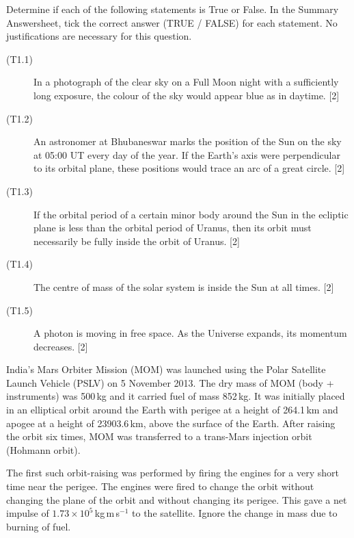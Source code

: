 Determine if each of the following statements is True or False. In the Summary
Answersheet, tick the correct answer (TRUE / FALSE) for each statement. No
justifications are necessary for this question.

\begin{description}
\item[(T1.1)] In a photograph of the clear sky on a Full Moon night with a
  sufficiently long exposure, the colour of the sky would appear blue as in
  daytime. \hfill[2]
\item[(T1.2)] An astronomer at Bhubaneswar marks the position of the Sun on
  the sky at 05:00 UT every day of the year. If the Earth's axis were
  perpendicular to its orbital plane, these positions would trace an arc of a
  great circle. \hfill[2]
\item[(T1.3)] If the orbital period of a certain minor body around the Sun in
  the ecliptic plane is less than the orbital period of Uranus, then its orbit
  must necessarily be fully inside the orbit of Uranus. \hfill[2]
\item[(T1.4)] The centre of mass of the solar system is inside the Sun at all
  times. \hfill[2]
\item[(T1.5)] A photon is moving in free space. As the Universe expands, its
  momentum decreases. \hfill[2]
\end{description}

India's Mars Orbiter Mission (MOM) was launched using the Polar Satellite
Launch Vehicle (PSLV) on 5 November 2013. The dry mass of MOM (body +
instruments) was 500\,kg and it carried fuel of mass 852\,kg. It was initially
placed in an elliptical orbit around the Earth with perigee at a height of
264.1\,km and apogee at a height of 23903.6\,km, above the surface of the
Earth. After raising the orbit six times, MOM was transferred to a trans-Mars
injection orbit (Hohmann orbit).

The first such orbit-raising was performed by firing the engines for a very
short time near the perigee. The engines were fired to change the orbit
without changing the plane of the orbit and without changing its perigee. This
gave a net impulse of $1.73 \times 10^5$\,kg\,m\,s$^{-1}$ to the satellite.
Ignore the change in mass due to burning of fuel.

